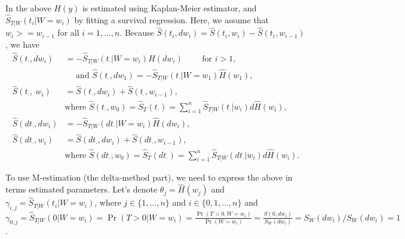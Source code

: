 \documentclass[]{article}\usepackage[]{graphicx}\usepackage[]{color}
\begin{document}
In the above $H(y)$ is estimated using Kaplan-Meier estimator, and $\widehat{S}_{T|W}(t_i | W=w_i)$ by fitting a survival regression. Here, we assume that $w_i >= w_{i-1}$ for all $i = 1,...,n$. Because $\widehat{S} (t_i, dw_i) = \widehat{S} (t_i, w_i) - \widehat{S} (t_i, w_{i-1})$, we have
\begin{align*}
  \widehat{S} (t_{\cdot}, dw_i) &= -\widehat{S}_{T|W}(t_{\cdot} | W=w_i) \widehat{H}(dw_i) \text{~~~~~~~for  }i>1,\\
  &\text{~~~~and } \widehat{S} (t_{\cdot}, dw_1)  = 
   -\widehat{S}_{T|W}(t_{\cdot} | W=w_1) \widehat{H}(w_1),\\
  \widehat{S} (t_{\cdot}, ~w_i) &= \widehat{S} (t_{\cdot}, dw_i) + \widehat{S} (t_{\cdot}, w_{i-1}),\\
   &\text{where } \widehat{S} (t_{\cdot}, w_0) = \widehat{S}_{T}(t_{\cdot}) = \sum_{i=1}^n \widehat{S}_{T|W}(t_{\cdot}|w_i)d\widehat{H}(w_i),\\
   \widehat{S} (dt_{\cdot}, dw_i) &= -\widehat{S}_{T|W}(dt_{\cdot} | W=w_i) \widehat{H}(dw_i),\\
   \widehat{S} (dt_{\cdot}, w_i) &=  \widehat{S} (dt_{\cdot}, dw_i) + \widehat{S} (dt_{\cdot}, w_{i-1}),\\
   &\text{where } \widehat{S} (dt_{\cdot}, w_0) = \widehat{S}_{T}(dt_{\cdot}) = \sum_{i=1}^n \widehat{S}_{T|W}(dt_{\cdot}|w_i)d\widehat{H}(w_i).
\end{align*}

To use M-estimation (the delta-method part), we need to express the above in terms estimated parameters. Let's denote $\theta_{j} = \widehat{H}(w_j)$ and $\gamma_{i, j} = \widehat{S}_{T|W}(t_i | W=w_i)$, where $j \in \{ 1, ..., n\}$ and $i \in \{ 0,1, ..., n\}$ and $\gamma_{0, j} = \widehat{S}_{T|W}(0 | W=w_i) = \Pr(T>0 | W = w_i) = \frac{  \Pr(T>0 , W = w_i)   }{  \Pr(W = w_i)  } =  \frac{  S(0 , d w_i)   }{  S_W(d w_i)  }  = S_W(dw_i)/S_W(dw_i) = 1 $.
\end{document}
